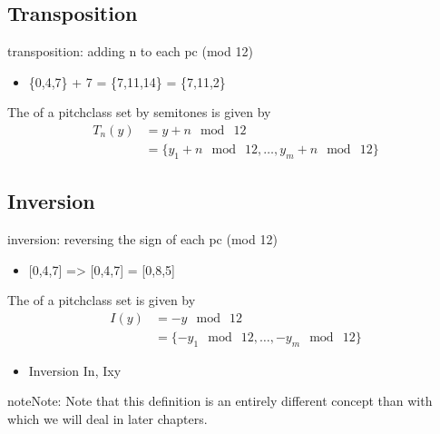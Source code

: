 \documentclass[letterpaper,10pt,english]{sphinxmanual}
\begin{document}
\subsection{Transposition}
\label{\detokenize{2_fundamentals1:transposition}}
transposition: adding n to each pc (mod 12)
\begin{itemize}
\item {} 
\{0,4,7\} + 7 = \{7,11,14\} = \{7,11,2\}

\end{itemize}

The  of a pitch\sphinxhyphen{}class set  by  semitones is given by
\begin{equation*}
\begin{split}T_n(y) &= y + n\mod~12\\
       &= \{y_1 + n\mod~12, \ldots, y_m + n\mod~12\}\end{split}
\end{equation*}

\subsection{Inversion}
\label{\detokenize{2_fundamentals1:inversion}}
inversion: reversing the sign of each pc (mod 12)
\begin{itemize}
\item {} 
{[}0,4,7{]} =\textgreater{} {[}0,\sphinxhyphen{}4,\sphinxhyphen{}7{]} = {[}0,8,5{]}

\end{itemize}

The  of a pitch\sphinxhyphen{}class set  is given by
\begin{equation*}
\begin{split}I(y) &= -y\mod~12 \\
     &= \{-y_1\mod~12, \ldots,-y_m\mod~12\}\end{split}
\end{equation*}\begin{itemize}
\item {} 
Inversion In, Ixy

\end{itemize}

\begin{sphinxadmonition}{note}{Note:}
Note that this definition is an entirely different concept
than  with which we will deal in later chapters.
\end{sphinxadmonition}
\end{document}
